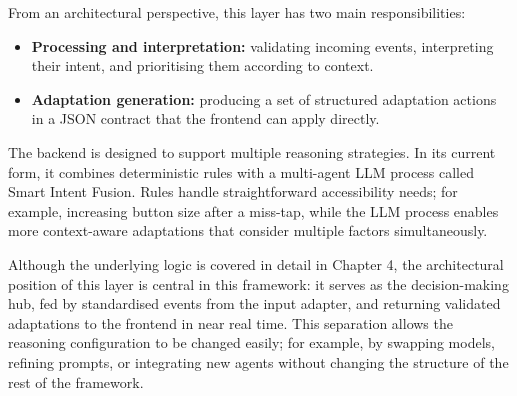 \documentclass[openany]{book}
\begin{document}
From an architectural perspective, this layer has two main responsibilities:
\begin{itemize}
    \item \textbf{Processing and interpretation:} validating incoming events, interpreting their intent, and prioritising them according to context.
    \item \textbf{Adaptation generation:} producing a set of structured adaptation actions in a JSON contract that the frontend can apply directly.
\end{itemize}

The backend is designed to support multiple reasoning strategies. In its current form, it combines deterministic rules with a multi-agent LLM process called Smart Intent Fusion. Rules handle straightforward accessibility needs; for example, increasing button size after a miss-tap, while the LLM process enables more context-aware adaptations that consider multiple factors simultaneously.

Although the underlying logic is covered in detail in Chapter 4, the architectural position of this layer is central in this framework: it serves as the decision-making hub, fed by standardised events from the input adapter, and returning validated adaptations to the frontend in near real time. This separation allows the reasoning configuration to be changed easily; for example, by swapping models, refining prompts, or integrating new agents without changing the structure of the rest of the framework.

\end{document}
